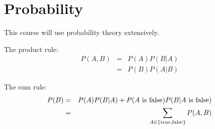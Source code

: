 \chapter{Probability}
This course will use probability theory extensively.

The product rule:
\begin{eqnarray}
P(A, B) &=& P(A)P(B|A) \\
&=& P(B)P(A|B)
\end{eqnarray}

The sum rule:
\begin{eqnarray}
P(B) &=& P(A)P(B|A) + P(A\textnormal{ is false})P(B|A\textnormal{ is false}) \\
&=& \sum_{A \in \{\rm true, false\}} P(A, B)
\end{eqnarray}

